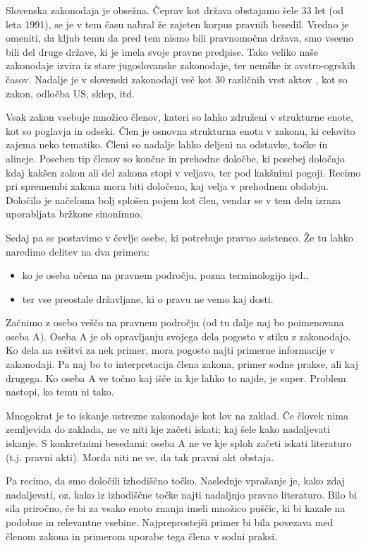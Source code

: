 \documentclass[a4paper,12pt,openright]{book}
\begin{document}
Slovenska zakonodaja je obsežna. Čeprav kot država obstajamo šele 33 let (od leta 1991), se je v tem času nabral že zajeten korpus pravnih besedil. Vredno je omeniti, da kljub temu da pred tem nismo bili pravnomočna država, smo vseeno bili del druge države, ki je imela svoje pravne predpise. Tako veliko naše zakonodaje izvira iz stare jugoslovanske zakonodaje, ter nemške iz avstro-ogrskih časov. Nadalje je v slovenski zakonodaji več kot 30 različnih vrst aktov \cite{pisrs_api_akti}, kot so zakon, odločba US, sklep, itd.

Vsak zakon vsebuje množico členov, kateri so lahko združeni v strukturne enote, kot so poglavja in odseki. Člen je osnovna strukturna enota v zakonu, ki celovito zajema neko tematiko. Členi so nadalje lahko deljeni na odstavke, točke in alineje. Poseben tip členov so končne in prehodne določbe, ki posebej določajo kdaj kakšen zakon ali del zakona stopi v veljavo, ter pod kakšnimi pogoji. Recimo pri spremembi zakona mora biti določeno, kaj velja v prehodnem obdobju. Določilo je načeloma bolj splošen pojem kot člen, vendar se v tem delu izraza uporabljata bržkone sinonimno.

Sedaj pa se postavimo v čevlje osebe, ki potrebuje pravno asistenco. Že tu lahko naredimo delitev na dva primera: 
\begin{itemize}
    \item ko je oseba učena na pravnem področju, pozna terminologijo ipd.,
    \item ter vse preostale državljane, ki o pravu ne vemo kaj dosti.
\end{itemize}

Začnimo z osebo veščo na pravnem področju (od tu dalje naj bo poimenovana oseba A). Oseba A je ob opravljanju svojega dela pogosto v stiku z zakonodajo. Ko dela na rešitvi za nek primer, mora pogosto najti primerne informacije v zakonodaji. Pa naj bo to interpretacija člena zakona, primer sodne prakse, ali kaj drugega. Ko oseba A ve točno kaj išče in kje lahko to najde, je super. Problem nastopi, ko temu ni tako.

Mnogokrat je to iskanje ustrezne zakonodaje kot lov na zaklad. Če človek nima zemljevida do zaklada, ne ve niti kje začeti iskati; kaj šele kako nadaljevati iskanje. S konkretnimi besedami: oseba A ne ve kje sploh začeti iskati literaturo (t.j. pravni akti). Morda niti ne ve, da tak pravni akt obstaja.

Pa recimo, da smo določili izhodiščno točko. Naslednje vprašanje je, kako zdaj nadaljevati, oz. kako iz izhodiščne točke najti nadaljnjo pravno literaturo. Bilo bi sila priročno, če bi za vsako enoto znanja imeli množico puščic, ki bi kazale na podobne in relevantne vsebine. Najpreprostejši primer bi bila povezava med členom zakona in primerom uporabe tega člena v sodni praksi.
\end{document}
